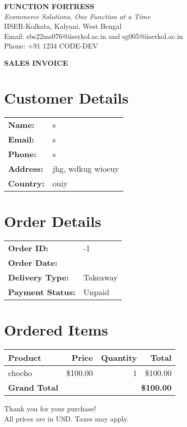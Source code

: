 \documentclass[12pt]{article}
\begin{document}
\begin{center}
{\large\textbf{FUNCTION FORTRESS}}\\
\textit{Ecommerce Solutions, One Function at a Time}\\
IISER-Kolkata, Kalyani, West Bengal\\
Email: sbs22ms076@iiserkol.ac.in and sg005@iiserkol.ac.in\\
Phone: +91 1234 CODE-DEV
\end{center}

\begin{center}
{\Large\textbf{SALES INVOICE}}
\end{center}

\section*{Customer Details}
\begin{tabular}{ll}
\textbf{Name:} & s \\
\textbf{Email:} & s \\
\textbf{Phone:} & s \\
\textbf{Address:} & jhg, wdkug wioeuy \\
\textbf{Country:} & ouiy
\end{tabular}

\section*{Order Details}
\begin{tabular}{ll}
\textbf{Order ID:} & -1 \\
\textbf{Order Date:} &  \\
\textbf{Delivery Type:} & Takeaway \\
\textbf{Payment Status:} & Unpaid
\end{tabular}

\section*{Ordered Items}
\begin{tabular}{lrrr}
\toprule
\textbf{Product} & \textbf{Price} & \textbf{Quantity} & \textbf{Total} \\
\midrule
chocho & \${100.00} & 1 & \${100.00} \\
\midrule
\textbf{Grand Total} & \multicolumn{3}{r}{\textbf{\${100.00}}} \\
\bottomrule
\end{tabular}

\vfill
\begin{center}
{\small Thank you for your purchase!}\\
{\small All prices are in USD. Taxes may apply.}
\end{center}
\end{document}
